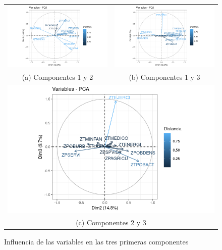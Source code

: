 \documentclass[letterpaper,11pt]{article}
\begin{document}
\begin{figure}[]
\begin{tabular}{cc}
\includegraphics[scale=0.4]{./img/ACP_PC12.png} & \includegraphics[scale=0.4]{./img/ACP_PC13.png} \\
(a) Componentes 1 y 2 & (b) Componentes 1 y 3 \\[6pt]
\multicolumn{2}{c}{\includegraphics[scale=0.4]{./img/ACP_PC23.png}} \\
\multicolumn{2}{c}{(c) Componentes 2 y 3 }

\end{tabular}
\caption{Influencia de las variables en las tres primeras componentes}
\label{ACP_variables}
\end{figure}
\end{document}
